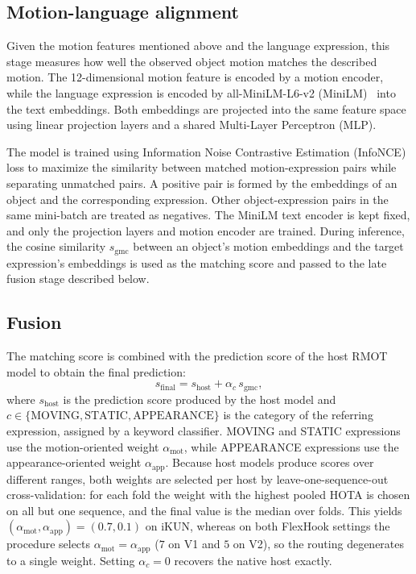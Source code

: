 \documentclass{article}
\begin{document}
\subsection{Motion-language alignment}
\label{sec:align}
Given the motion features mentioned above and the language expression, this stage measures how well the observed object motion matches the described motion. The 12-dimensional motion feature is encoded by a motion encoder, while the language expression is encoded by all-MiniLM-L6-v2 (MiniLM)~\cite{sbert} into the text embeddings. Both embeddings are projected into the same feature space using linear projection layers and a shared Multi-Layer Perceptron (MLP).

The model is trained using Information Noise Contrastive Estimation (InfoNCE)~\cite{infonce} loss to maximize the similarity between matched motion-expression pairs while separating unmatched pairs. A positive pair is formed by the embeddings of an object and the corresponding expression. Other object-expression pairs in the same mini-batch are treated as negatives. The MiniLM text encoder is kept fixed, and only the projection layers and motion encoder are trained. During inference, the cosine similarity $s_{\mathrm{gmc}}$ between an object's motion embeddings and the target expression's embeddings is used as the matching score and passed to the late fusion stage described below.

\subsection{Fusion}
\label{sec:fusion}
The matching score is combined with the prediction score of the host RMOT model to obtain the final prediction:
\begin{equation}
  s_{\mathrm{final}} = s_{\mathrm{host}} + \alpha_{c}\,s_{\mathrm{gmc}},
  \label{eq:fusion}
\end{equation}
where $s_{\mathrm{host}}$ is the prediction score produced by the host model and $c\in\{\mathrm{MOVING},\mathrm{STATIC},\mathrm{APPEARANCE}\}$ is the category of the referring expression, assigned by a keyword classifier. MOVING and STATIC expressions use the motion-oriented weight $\alpha_{\mathrm{mot}}$, while APPEARANCE expressions use the appearance-oriented weight $\alpha_{\mathrm{app}}$. Because host models produce scores over different ranges, both weights are selected per host by leave-one-sequence-out cross-validation: for each fold the weight with the highest pooled HOTA is chosen on all but one sequence, and the final value is the median over folds. This yields $(\alpha_{\mathrm{mot}},\alpha_{\mathrm{app}})=(0.7,0.1)$ on iKUN, whereas on both FlexHook settings the procedure selects $\alpha_{\mathrm{mot}}=\alpha_{\mathrm{app}}$ ($7$ on V1 and $5$ on V2), so the routing degenerates to a single weight. Setting $\alpha_c=0$ recovers the native host exactly.
\end{document}
